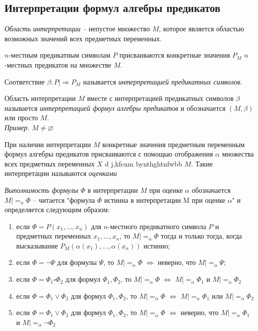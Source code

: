 \documentclass[otchet]{SCWorks}
\begin{document}
\subsection{Интерпретации формул алгебры предикатов}
\par {\it Область интерпретации} -- непустое множество $M$, которое является областью возможных значений всех предметных переменных.
\par $n$-местным предикатным символам $P$ присваиваются конкретные значения $P_M$ $n$-местных предикатов на множестве $M$.
\par Соответствие $\beta: P |\Rightarrow P_M$ называется {\it интерпретацией предикатных символов}.
\par Область интерпретации $M$ вместе с интерпретацией предикатных символов $\beta$ называется {\it интерпретацией формул алгебры предикатов} и обозначается $(M, \beta)$ или просто $M$. \\
{\it Пример. }$M \neq \varnothing$ \\
\par При наличии интерпретации $M$ конкретные значения предметным переменным формул алгебры предикатов присваиваются с помощью отображения $\alpha$ множества всех предметных переменных $X$ d j,kfcnm bynthghtnfwbb $M$. Такие интерпретации называются {\it оценками}
\par {\it Выполнимость формулы} $\Phi$ в интерпретации $M$ при оценке $\alpha$ обозначается $M |=_\alpha \Phi$ -- читается "формула $\Phi$ истинна в интерпретации M при оценке $\alpha$" и определяется следующим образом:
\begin{enumerate}
    \item если $\Phi = P(x_1, \dots, x_n)$ для $n$-местного предикатного символа $P$ и предметных переменных $x_1, \dots, x_n$, то $M |=_\alpha \Phi$ тогда и только тогда, когда высказывание $P_M(\alpha(x_1),\dots,\alpha(x_n))$ истинно;
    \item если $\Phi = \neg \Psi$ для формулы $\Psi$, то $M |=_\alpha \Phi$ $\Leftrightarrow$ неверно, что $M |=_\alpha \Psi$;
    \item если $\Phi = \Phi_1 \square \Phi_2$ для формул $\Phi_1, \Phi_2$, то $M |=_\alpha \Phi$ $\Leftrightarrow$ $M |=_\alpha \Phi_1$ и $M |=_\alpha \Phi_2$
    \item если $\Phi = \Phi_1 \lor \Phi_2$ для формул $\Phi_1, \Phi_2$, то $M |=_\alpha \Phi$ $\Leftrightarrow$ $M |=_\alpha \Phi_1$ или $M |=_\alpha \Phi_2$
    \item если $\Phi = \Phi_1 \lor \Phi_2$ для формул $\Phi_1, \Phi_2$, то $M |=_\alpha \Phi$ $\Leftrightarrow$ неверно, что $M |=_\alpha \Phi_1$ и $M |=_\alpha \neg \Phi_2$
\end{enumerate}
\end{document}
